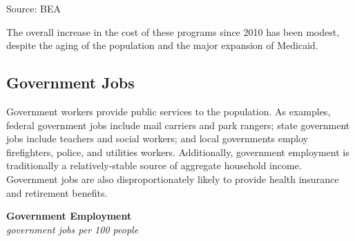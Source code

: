\documentclass{report}
\makeatletter
\newcommand{\tbllink}[1]{\href{https://raw.githubusercontent.com/bdecon/US-chartbook/master/chartbook/data/#1}{\faTable}}
\newcommand*\short[1]{\expandafter\@gobbletwo\number\numexpr#1\relax}
\newcommand{\absnode}[3]{\node[below right, align=left] at (axis cs: #1,#2) {#3};}
\newcommand{\shdateaxisticks}{
		date coordinates in=x, axis line style={draw=none},
		xmax={2024-01-31},
		max space between ticks=40,	    
		xtick={{1990-01-01}, {1995-01-01}, {2000-01-01}, 
			{2005-01-01}, {2010-01-01}, {2015-01-01}, {2020-01-01}},
		minor xtick={},
		enlarge y limits={0.06}, enlarge x limits={0.01},
		xticklabel style={align=center, yshift=-2pt}, tick label style={inner sep=0pt},
		}
\newcommand{\bbar}[2]{extra #1 ticks = {{#2}}, extra #1 tick labels = ,
		extra #1 tick style = {grid=major, grid style={thick, black!25}},}
\newcommand{\stdline}[4]{\addplot[very thick, no markers, color=#1] 
		table [x=#2, y=#3, col sep=comma] {#4};	}
\newcommand{\rbars}{
		\fill[color=black!10] (axis cs:{1990-07-01},\pgfkeysvalueof{/pgfplots/ymin})
			rectangle (axis cs:{1991-03-01}, \pgfkeysvalueof{/pgfplots/ymax});
		\fill[color=black!10] (axis cs:{2007-12-01},\pgfkeysvalueof{/pgfplots/ymin})
			rectangle (axis cs:{2009-07-01}, \pgfkeysvalueof{/pgfplots/ymax});
		\fill[color=black!10] (axis cs:{2001-03-01},\pgfkeysvalueof{/pgfplots/ymin})
			rectangle (axis cs:{2001-11-01}, \pgfkeysvalueof{/pgfplots/ymax});
		\fill[color=black!10] (axis cs:{2020-02-01},\pgfkeysvalueof{/pgfplots/ymin})
			rectangle (axis cs:{2020-05-01}, \pgfkeysvalueof{/pgfplots/ymax});}
\makeatother
\begin{document}
{\begin{minipage}{0.35\textwidth}
\footnotesize{Source: BEA} \hfill \tbllink{prog_exp.csv}
\end{minipage}
\vspace{1mm}

\begin{minipage}{1.0\textwidth}
\small The overall increase in the cost of these programs since 2010 has been modest, despite the aging of the population and the major expansion of Medicaid. 
\end{minipage} 
\newpage
\hypertarget{govjo}{\label{govjo}}
\vspace*{-10mm}

\begin{minipage}{1.0\textwidth}
\subsection*{Government Jobs}
 
\small Government workers provide public services to the population. As examples, federal government jobs include mail carriers and park rangers; state government jobs include teachers and social workers; and local governments employ firefighters, police, and utilities workers. Additionally, government employment is traditionally a relatively-stable source of aggregate household income. Government jobs are also disproportionately likely to provide health insurance and retirement benefits.  
\end{minipage}
\vspace{1mm}

\begin{minipage}{0.34\textwidth}
\normalsize \textbf{Government Employment}\\
\footnotesize{\textit{government jobs per 100 people}}
\vspace{6.75cm}

\hspace{1mm} 


\end{minipage}}
\end{document}
